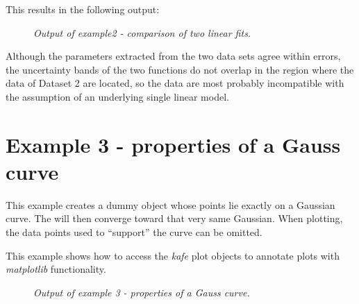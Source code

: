 \documentclass[a4paper,10pt,english]{sphinxmanual}
\begin{document}
This results in the following output:
\begin{figure}[htbp]
\centering
\capstart

\caption{\emph{Output of example2 - comparison of two linear fits.}}\end{figure}

Although the parameters extracted from the two data sets agree within
errors, the uncertainty bands of the two functions do not overlap
in the region where the data of Dataset 2 are located, so the data
are most probably incompatible with the assumption of an underlying
single linear model.


\section{Example 3 - properties of a Gauss curve}
\label{index:example-3-properties-of-a-gauss-curve}
This example creates a dummy  object whose points lie exactly
on a Gaussian curve. The  will then converge toward that very same
Gaussian. When plotting, the data points used to ``support'' the curve
can be omitted.

This example shows how to access the \emph{kafe} plot objects
to annotate plots with \emph{matplotlib} functionality.
\begin{figure}[htbp]
\centering
\capstart

\caption{\emph{Output of example 3 - properties of a Gauss curve.}}\end{figure}
\end{document}
